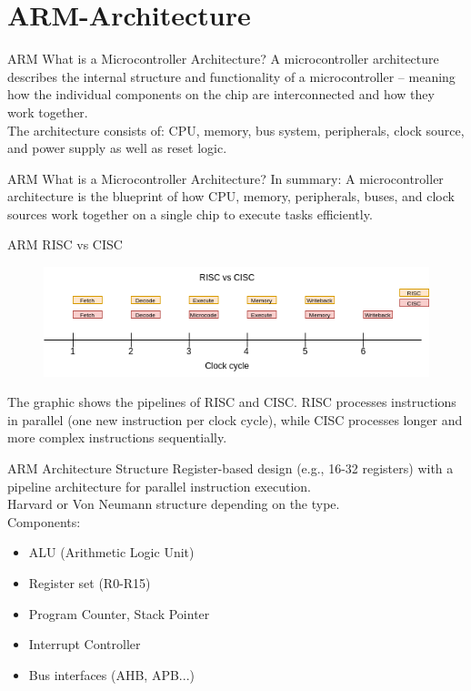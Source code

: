 \documentclass{beamer}
\begin{document}
\section{ARM-Architecture}
\begin{frame}{ARM}
	{What is a Microcontroller Architecture?}
	A microcontroller architecture describes the internal structure and functionality of a microcontroller – meaning how the individual components on the chip are interconnected and how they work together.\\
	\vspace{0.2cm}
	The architecture consists of: CPU, memory, bus system, peripherals, clock source, and power supply as well as reset logic.
\end{frame}
\begin{frame}{ARM}
	{What is a Microcontroller Architecture?}
	In summary: A microcontroller architecture is the blueprint of how CPU, memory, peripherals, buses, and clock sources work together on a single chip to execute tasks efficiently.
\end{frame}
\begin{frame}{ARM}
	{RISC vs CISC}
	\begin{figure}
		\centering
		\includegraphics[width=\linewidth]{RISC_CISC_Pipe.png}
	\end{figure}
	The graphic shows the pipelines of RISC and CISC. RISC processes instructions in parallel (one new instruction per clock cycle), while CISC processes longer and more complex instructions sequentially.
\end{frame}
\begin{frame}{ARM}
	{Architecture Structure}
	Register-based design (e.g., 16-32 registers) with a pipeline architecture for parallel instruction execution.\\
	\vspace{0.2cm}
	Harvard or Von Neumann structure depending on the type.\\
	\vspace{0.2cm}
	Components:
	\begin{itemize}
		\item ALU (Arithmetic Logic Unit)
		\item Register set (R0-R15)
		\item Program Counter, Stack Pointer
		\item Interrupt Controller
		\item Bus interfaces (AHB, APB...)
	\end{itemize}
\end{frame}
\end{document}
